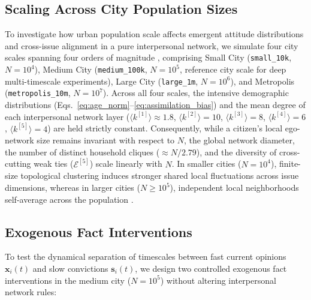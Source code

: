 \documentclass{article}
\begin{document}
\subsection{Scaling Across City Population Sizes}
\label{subsec:city_scaling}

To investigate how urban population scale affects emergent attitude distributions and cross-issue alignment in a pure interpersonal network, we simulate four city scales spanning four orders of magnitude \citep{bettencourt2007growth, schlapfer2014scaling}, comprising Small City (\texttt{small\_10k}, $N = 10^4$), Medium City (\texttt{medium\_100k}, $N = 10^5$, reference city scale for deep multi-timescale experiments), Large City (\texttt{large\_1m}, $N = 10^6$), and Metropolis (\texttt{metropolis\_10m}, $N = 10^7$). Across all four scales, the intensive demographic distributions (Eqs.~\eqref{eq:age_norm}--\eqref{eq:assimilation_bias}) and the mean degree of each interpersonal network layer ($\langle k^{[1]} \rangle \approx 1.8$, $\langle k^{[2]} \rangle = 10$, $\langle k^{[3]} \rangle = 8$, $\langle k^{[4]} \rangle = 6$, $\langle k^{[5]} \rangle = 4$) are held strictly constant. Consequently, while a citizen's local ego-network size remains invariant with respect to $N$, the global network diameter, the number of distinct household cliques ($\approx N / 2.79$), and the diversity of cross-cutting weak ties ($\mathcal{E}^{[5]}$) scale linearly with $N$. In smaller cities ($N = 10^4$), finite-size topological clustering induces stronger shared local fluctuations across issue dimensions, whereas in larger cities ($N \ge 10^5$), independent local neighborhoods self-average across the population \citep{castellano2009statistical}.

\subsection{Exogenous Fact Interventions}
\label{subsec:interventions}

To test the dynamical separation of timescales between fast current opinions $\mathbf{x}_i(t)$ and slow convictions $\mathbf{s}_i(t)$, we design two controlled exogenous fact interventions in the medium city ($N = 10^5$) without altering interpersonal network rules:
\end{document}
